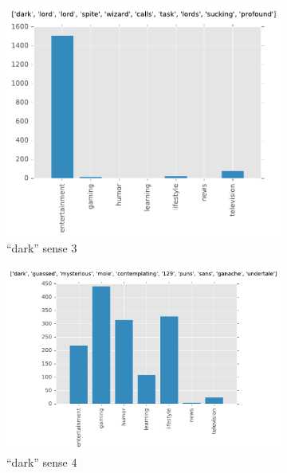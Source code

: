 \begin{landscape}
\begin{figure}[H]
\begin{subfigure}[t]{.3\textwidth}
\centering\includegraphics[]{figures/reddit-dark-2.pdf}
\caption{``dark'' sense 3}
\label{fig-reddit-dark-2}
\end{subfigure}
\begin{subfigure}[t]{.3\textwidth}
\centering\includegraphics[]{figures/reddit-dark-3.pdf}
\caption{``dark'' sense 4}
\label{fig-reddit-dark-3}
\end{subfigure}
\begin{subfigure}[t]{.3\textwidth}

\end{subfigure}
\end{figure}
\end{landscape}
